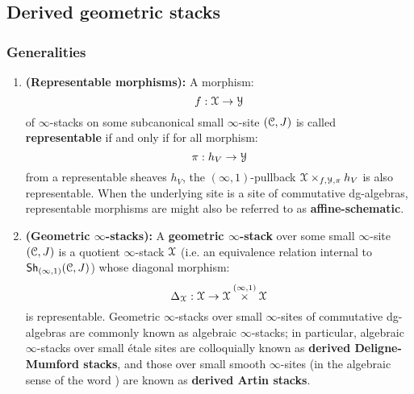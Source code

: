         \subsection{Derived geometric stacks}
            \subsubsection{Generalities}
                \begin{definition} \label{def: derived_geometric_stacks} 
                    \noindent
                    \begin{enumerate}
                        \item \textbf{(Representable morphisms):} A morphism:
                            $$f: \mathcal{X} \to \mathcal{Y}$$
                        of $\infty$-stacks on some subcanonical small $\infty$-site $(\mathcal{C}, J)$ is called \textbf{representable} if and only if for all morphism:
                            $$\pi: h_V \to \mathcal{Y}$$
                        from a representable sheaves $h_V$, the $(\infty, 1)$-pullback $\calX \x_{f, \calY, \pi} h_V$ is also representable. When the underlying site is a site of commutative dg-algebras, representable morphisms are might also be referred to as \textbf{affine-schematic}.
                        \item \textbf{(Geometric $\infty$-stacks):} A \textbf{geometric $\infty$-stack} over some small $\infty$-site $(\mathcal{C}, J)$ is a quotient $\infty$-stack $\mathcal{X}$ (i.e. an equivalence relation internal to $\mathsf{Sh}_{(\infty, 1)}(\mathcal{C}, J)$) whose diagonal morphism:
                            $$\Delta_{\calX}: \calX \to \calX \x^{(\infty, 1)} \calX$$
                        is representable. Geometric $\infty$-stacks over small $\infty$-sites of commutative dg-algebras are commonly known as algebraic $\infty$-stacks; in particular, algebraic $\infty$-stacks over small \'etale sites are colloquially known as \textbf{derived Deligne-Mumford stacks}, and those over small smooth $\infty$-sites (in the algebraic sense of the word ) are known as \textbf{derived Artin stacks}.   
                    \end{enumerate}
                \end{definition}
                
